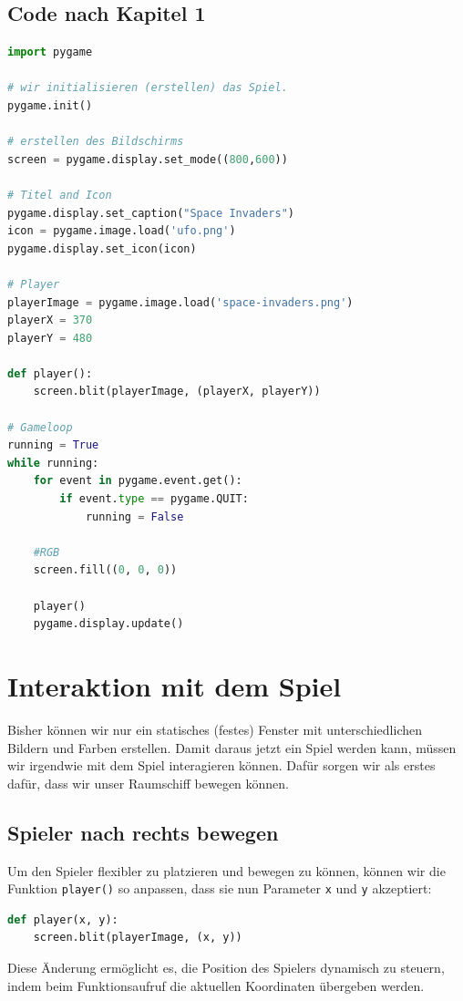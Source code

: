 \documentclass{article}
\begin{document}
\subsection*{Code nach Kapitel 1}

\begin{lstlisting}[style=pythonstyle, language=Python]
import pygame

# wir initialisieren (erstellen) das Spiel.
pygame.init()

# erstellen des Bildschirms
screen = pygame.display.set_mode((800,600))

# Titel and Icon
pygame.display.set_caption("Space Invaders")
icon = pygame.image.load('ufo.png')
pygame.display.set_icon(icon)

# Player
playerImage = pygame.image.load('space-invaders.png')
playerX = 370
playerY = 480

def player(): 
    screen.blit(playerImage, (playerX, playerY))

# Gameloop
running = True
while running:
    for event in pygame.event.get():
        if event.type == pygame.QUIT:
            running = False
    
    #RGB
    screen.fill((0, 0, 0))

    player()
    pygame.display.update()
\end{lstlisting}


\newpage
\section{Interaktion mit dem Spiel}
Bisher können wir nur ein statisches (festes) Fenster mit unterschiedlichen Bildern und Farben erstellen. Damit daraus jetzt ein Spiel werden kann, müssen wir irgendwie mit dem Spiel interagieren können. Dafür sorgen wir als erstes dafür, dass wir unser Raumschiff bewegen können. 
\subsection{Spieler nach rechts bewegen}
Um den Spieler flexibler zu platzieren und bewegen zu können, können wir die Funktion \texttt{player()} so anpassen, dass sie nun Parameter \texttt{x} und \texttt{y} akzeptiert:

\begin{lstlisting}[style=pythonstyle, language=Python]
def player(x, y):
    screen.blit(playerImage, (x, y))
\end{lstlisting}

Diese Änderung ermöglicht es, die Position des Spielers dynamisch zu steuern, indem beim Funktionsaufruf die aktuellen Koordinaten übergeben werden.
\end{document}
